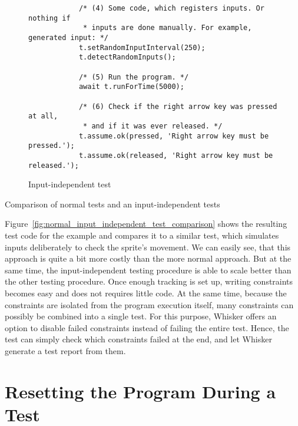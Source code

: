 \begin{listing}[htpb]
\begin{subfigure}[b]{.50\textwidth}
\begin{verbatim}
            /* (4) Some code, which registers inputs. Or nothing if
             * inputs are done manually. For example, generated input: */
            t.setRandomInputInterval(250);
            t.detectRandomInputs();

            /* (5) Run the program. */
            await t.runForTime(5000);

            /* (6) Check if the right arrow key was pressed at all,
             * and if it was ever released. */
            t.assume.ok(pressed, 'Right arrow key must be pressed.');
            t.assume.ok(released, 'Right arrow key must be released.');
        \end{verbatim}
        \vspace{-\bigskipamount}
        \caption{Input-independent test}
        \label{fig:normal_input_independent_test_comparison_constraint}
    \end{subfigure}
    \caption{Comparison of normal tests and an input-independent tests}
    \label{fig:normal_input_independent_test_comparison}
\end{listing}
\parspace

Figure~\ref{fig:normal_input_independent_test_comparison} shows the resulting test code for the example
and compares it to a similar test, which simulates inputs deliberately to check the sprite's movement.
We can easily see, that this approach is quite a bit more costly than the more normal approach.
But at the same time, the input-independent testing procedure is able to scale better than the other testing procedure.
Once enough tracking is set up, writing constraints becomes easy and does not requires little code.
At the same time, because the constraints are isolated from the program execution itself,
many constraints can possibly be combined into a single test.
For this purpose, Whisker offers an option to disable failed constraints instead of failing the entire test.
Hence, the test can simply check which constraints failed at the end, and let Whisker generate a test report from them.

\section{Resetting the Program During a Test}
\label{sec:resetting_the_program_during_a_test}

